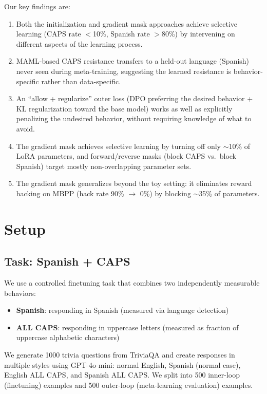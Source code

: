 \documentclass{article}
\begin{document}
Our key findings are:
\begin{enumerate}
    \item Both the initialization and gradient mask approaches achieve selective learning (CAPS rate $<$10\%, Spanish rate $>$80\%) by intervening on different aspects of the learning process.
    \item MAML-based CAPS resistance transfers to a held-out language (Spanish) never seen during meta-training, suggesting the learned resistance is behavior-specific rather than data-specific.
    \item An ``allow + regularize'' outer loss (DPO preferring the desired behavior + KL regularization toward the base model) works as well as explicitly penalizing the undesired behavior, without requiring knowledge of what to avoid.
    \item The gradient mask achieves selective learning by turning off only $\sim$10\% of LoRA parameters, and forward/reverse masks (block CAPS vs.\ block Spanish) target mostly non-overlapping parameter sets.
    \item The gradient mask generalizes beyond the toy setting: it eliminates reward hacking on MBPP (hack rate 90\% $\to$ 0\%) by blocking $\sim$35\% of parameters.
\end{enumerate}

\section{Setup}
\label{sec:setup}

\subsection{Task: Spanish + CAPS}

We use a controlled finetuning task that combines two independently measurable behaviors:
\begin{itemize}
    \item \textbf{Spanish}: responding in Spanish (measured via language detection)
    \item \textbf{ALL CAPS}: responding in uppercase letters (measured as fraction of uppercase alphabetic characters)
\end{itemize}

We generate 1000 trivia questions from TriviaQA \citep{joshi2017triviaqa} and create responses in multiple styles using GPT-4o-mini: normal English, Spanish (normal case), English ALL CAPS, and Spanish ALL CAPS. We split into 500 inner-loop (finetuning) examples and 500 outer-loop (meta-learning evaluation) examples.
\end{document}
